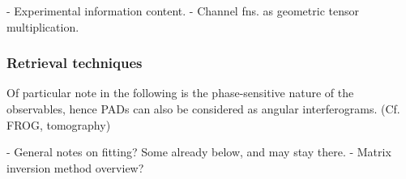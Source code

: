 




- Experimental information content.
- Channel fns. as geometric tensor multiplication.


\subsubsection{Retrieval techniques}

Of particular note in the following is the phase-sensitive nature of the observables, hence PADs can also be considered as angular interferograms. (Cf. FROG, tomography)

- General notes on fitting? Some already below, and may stay there.
- Matrix inversion method overview?

